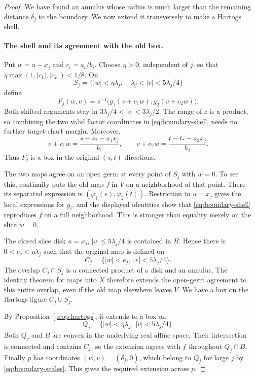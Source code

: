 \begin{proof}
We have found an annulus whose radius is much larger than the remaining
distance $\delta_j$ to the boundary.  We now extend it transversely to
make a Hartogs shell.

\paragraph{The shell and its agreement with the old box.}
Put $w=u-x_j$ and $c_i=a_i/b_i$.  Choose $\eta>0$, independent of $j$,
so that $\eta\max(1,|c_1|,|c_2|)<1/8$.  On
\[
  S_j=\{|w|<\eta\lambda_j,\quad
                \lambda_j<|v|<5\lambda_j/4\}
\]
define
\begin{equation}\label{eq:boundary-shell}
  F_j(w,v)=z^{-1}\bigl(g_1(v+c_1w),g_2(v+c_2w)\bigr).
\end{equation}
Both shifted arguments stay in
$3\lambda_j/4<|v|<3\lambda_j/2$.  The range of $z$ is a product, so
combining the two valid factor coordinates in
\eqref{eq:boundary-shell} needs no further target-chart margin.  Moreover,
\[
  v+c_1w=\frac{s-s_*-a_1x_j}{b_1},\qquad
  v+c_2w=\frac{t-t_*-a_2x_j}{b_2}.
\]
Thus $F_j$ is a box in the original $(s,t)$ directions.

The two maps agree on an open germ at every point of $S_j$ with $w=0$.
To see this, continuity puts the old map $f$ in $V$ on a neighborhood
of that point.  There its separated expression is
$(\varphi_1(s),\varphi_2(t))$.  Restriction to $u=x_j$ gives the local
expressions for $g_i$, and the displayed identities show that
\eqref{eq:boundary-shell} reproduces $f$ on a full neighborhood.  This
is stronger than equality merely on the slice $w=0$.

The closed slice disk $u=x_j$, $|v|\le5\lambda_j/4$ is contained in
$B$.  Hence there is $0<e_j<\eta\lambda_j$ such that the original map
is defined on
\[
  C_j=\{|w|<e_j,\ |v|<5\lambda_j/4\}.
\]
The overlap $C_j\cap S_j$ is a connected product of a disk and an
annulus.  The identity theorem for maps into $X$ therefore extends the
open-germ agreement to this entire overlap, even if the old map elsewhere
leaves $V$.  We have a box on the Hartogs figure $C_j\cup S_j$.

By Proposition~\ref{prop:hartogs}, it extends to a box on
\[
  Q_j=\{|w|<\eta\lambda_j,\ |v|<5\lambda_j/4\}.
\]
Both $Q_j$ and $B$ are convex in the underlying real affine space.
Their intersection is connected and contains $C_j$, so the extension
agrees with $f$ throughout $Q_j\cap B$.  Finally $p$ has coordinates
$(w,v)=(\delta_j,0)$, which belong to $Q_j$ for large $j$ by
\eqref{eq:boundary-scales}.  This gives the required extension across
$p$.
\end{proof}
